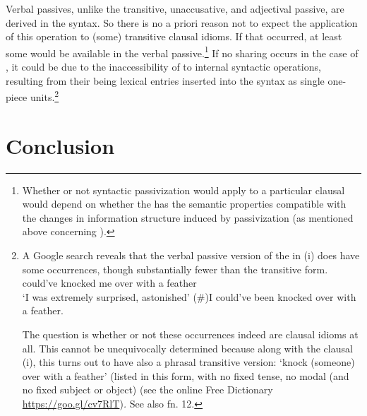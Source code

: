 \documentclass[output=paper,
modfonts
]{LSP/langsci}
\begin{document}
Verbal passives, unlike the transitive, unaccusative, and adjectival
passive, are derived in the syntax. So there is no a priori reason not
to expect the application of this operation to (some) transitive clausal
idioms. If that occurred, at least some  would be
available in the verbal passive.\footnote{Whether or not syntactic
  passivization would apply to a particular clausal  would depend
  on whether the  has the semantic properties compatible with the
  changes in information structure induced by passivization (as
  mentioned above concerning ).} If no sharing occurs in
the case of , it could be due to the inaccessibility of
 to internal syntactic operations, resulting from their
being lexical entries inserted into the syntax as single one-piece
units.\footnote{A Google search reveals that the verbal passive version
  of the  in (i) does have some occurrences, though substantially
  fewer than the transitive form.
\ea \label{ex:horvath:fn17a} could've knocked me over with a feather\\
  `I was extremely surprised, astonished'
\ex \label{ex:horvath:fn17b}(\#)I could've been knocked over with a feather.
\z

  The question is whether or not these occurrences indeed are clausal
  idioms at all. This cannot be unequivocally determined because along
  with the clausal  (i), this  turns out to have also a
  phrasal transitive version: `knock (someone) over with a feather'
  (listed in this form, with no fixed tense, no modal (and no fixed
  subject or object) (see the online Free Dictionary
  \url{https://goo.gl/cv7RlT})\emph{.} See also fn. 12.}

\section{Conclusion}\label{sec:horvath:6}
\end{document}
